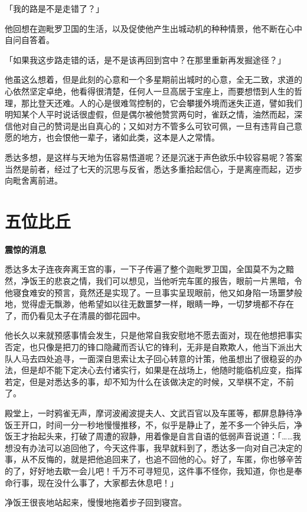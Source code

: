 \documentclass[twoside,openany]{book}
\newcommand{\mt}[1]{\textbullet \textbf{#1}}
\begin{document}
「我的路是不是走错了？」

他回想在迦毗罗卫国的生活，以及促使他产生出城动机的种种情景，他不断在心中自问自答着。

「如果我这步路走错的话，是不是该再回到宫中？在那里重新再发掘途径？」

他虽这么想着，但是此刻的心意和一个多星期前出城时的心意，全无二致，求道的心依然坚定卓绝，他看得很清楚，任何人一旦高居于宝座上，而要想悟到人生的哲理，那比登天还难。人的心是很难驾控制的，它会攀援外境而迷失正道，譬如我们明知某个人平时说话很虚假，但是偶尔被他赞赏两句时，雀跃之情，油然而起，深信他对自己的赞词是出自真心的；又如对方不管多么可钦可佩，一旦有违背自己意愿的地方，也会恨他一辈子，诸如此类，这本是人之常情。

悉达多想，是这样与天地为伍容易悟道呢？还是沉迷于声色欲乐中较容易呢？答案当然是前者，经过了七天的沉思与反省，悉达多重拾起信心，于是离座而起，迈步向毗舍离前进。

\section{五位比丘}\label{sec1.3}

\mt{震惊的消息}

悉达多太子连夜奔离王宫的事，一下子传遍了整个迦毗罗卫国，全国莫不为之黯然，净饭王的悲哀之情，我们可以想见，当他听完车匿的报告，眼前一片黑暗，令他寝食难安的预言，竟然还是实现了。一旦事实呈现眼前，他又如身陷一场噩梦般地，觉得虚无飘渺，他希望如以往无数噩梦一样，眼睛一睁，一切梦境都不存在了，而仍看见太子在清晨的御花园中。

他长久以来就预感事情会发生，只是他常自我安慰地不愿去面对，现在他想把事实否定，也只像是把刀的锋口隐藏而否认它的锋利，无非是自欺欺人，他当下派出大队人马去四处追寻，一面深自思索让太子回心转意的计策，他虽想出了很稳妥的办法，但是却不能下定决心去付诸实行，如果是在战场上，他随时能临机应变，指挥若定，但是对悉达多的事，却不知为什么在该做决定的时候，又举棋不定，不前了。

殿堂上，一时鸦雀无声，摩诃波阇波提夫人、文武百官以及车匿等，都屏息静待净饭王开口，时间一分一秒地慢慢推移，不，似乎是静止了，差不多一个钟头后，净饭王才抬起头来，打破了周遭的寂静，用着像是自言自语的低弱声音说道：「……我想没有办法可以追回他了，今天这件事，我早就料到了，悉达多一向对自己决定的事，从不反悔的，就是把他追回来了，也追不回他的心。好了，车匿，你也够辛苦的了，好好地去歇一会儿吧！千万不可寻短见，这件事不怪你，我知道，你也是奉命行事，现在没什么事了，大家都去休息吧！」

净饭王很丧地站起来，慢慢地拖着步子回到寝宫。
\end{document}
